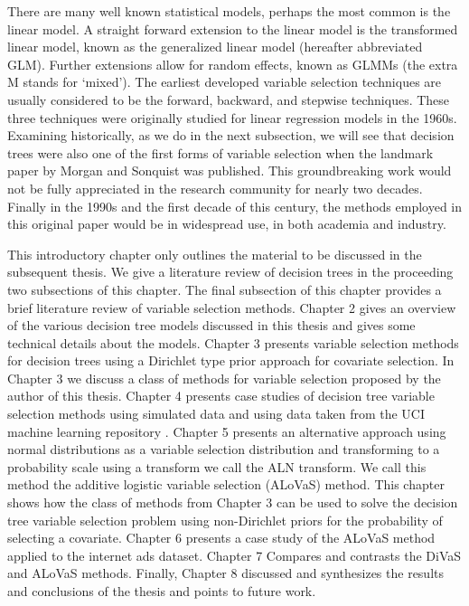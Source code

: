 There are many well known statistical models, perhaps the most common is the linear model. A straight forward extension to the linear model is the transformed linear model, known as the generalized linear model (hereafter abbreviated GLM).  Further extensions allow for random effects, known as GLMMs (the extra M stands for `mixed'). The earliest developed variable selection techniques are usually considered to be the forward, backward, and stepwise techniques. These three techniques were originally studied for linear regression models in the 1960s. Examining historically, as we do in the next subsection, we will see that decision trees were also one of the first forms of variable selection when the landmark paper by Morgan and Sonquist \cite{morgan1963problems} was published. This groundbreaking work would not be fully appreciated in the research community for nearly two decades. Finally in the 1990s and the first decade of this century, the methods employed in this original paper would be in widespread use, in both academia and industry. 

This introductory chapter only outlines the material to be discussed in the subsequent thesis. We give a literature review of decision trees in the proceeding two subsections of this chapter. The final subsection of this chapter provides a brief literature review of variable selection methods. Chapter 2 gives an overview of the various decision tree models discussed in this thesis and gives some technical details about the models. Chapter 3 presents variable selection methods for decision trees using a Dirichlet type prior approach for covariate selection. In Chapter 3 we discuss a class of methods for variable selection proposed by the author of this thesis. Chapter 4 presents case studies of decision tree variable selection methods using simulated data and using data taken from the UCI machine learning repository \cite{Frank:2010uq}. Chapter 5 presents an alternative approach using normal distributions as a variable selection distribution and transforming to a probability scale using a transform we call the ALN transform. We call this method the additive logistic variable selection (ALoVaS) method. 
This chapter shows how the class of methods from Chapter 3 can be used to solve the decision tree variable selection problem using non-Dirichlet priors for the probability of selecting a covariate. Chapter 6 presents a case study of the ALoVaS method applied to the internet ads dataset. Chapter 7 Compares  and contrasts the DiVaS  and ALoVaS  methods. Finally, Chapter 8 discussed and synthesizes the results and conclusions of the thesis and points to future work. %

